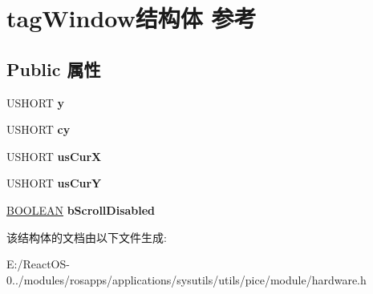 \hypertarget{structtag_window}{}\section{tag\+Window结构体 参考}
\label{structtag_window}
\subsection*{Public 属性}
\begin{DoxyCompactItemize}
\item 
\mbox{\label{structtag_window_a269387cc141dc1c311a27bc2d28a1bc2}} 
U\+S\+H\+O\+RT {\bfseries y}
\item 
\mbox{\label{structtag_window_a404a9105e30d0c2499e1897f9a1075ee}} 
U\+S\+H\+O\+RT {\bfseries cy}
\item 
\mbox{\label{structtag_window_aaea57e0e71c022b60ab278f7c40f652e}} 
U\+S\+H\+O\+RT {\bfseries us\+CurX}
\item 
\mbox{\label{structtag_window_a4de61763e456e376cbaa25bc94000e0d}} 
U\+S\+H\+O\+RT {\bfseries us\+CurY}
\item 
\mbox{\label{structtag_window_a6c3114eaabac214a8f11e605a3b94fe9}} 
\hyperlink{_processor_bind_8h_a112e3146cb38b6ee95e64d85842e380a}{B\+O\+O\+L\+E\+AN} {\bfseries b\+Scroll\+Disabled}
\end{DoxyCompactItemize}


该结构体的文档由以下文件生成\+:\begin{DoxyCompactItemize}
\item 
E\+:/\+React\+O\+S-\/0../modules/rosapps/applications/sysutils/utils/pice/module/hardware.\+h\end{DoxyCompactItemize}
